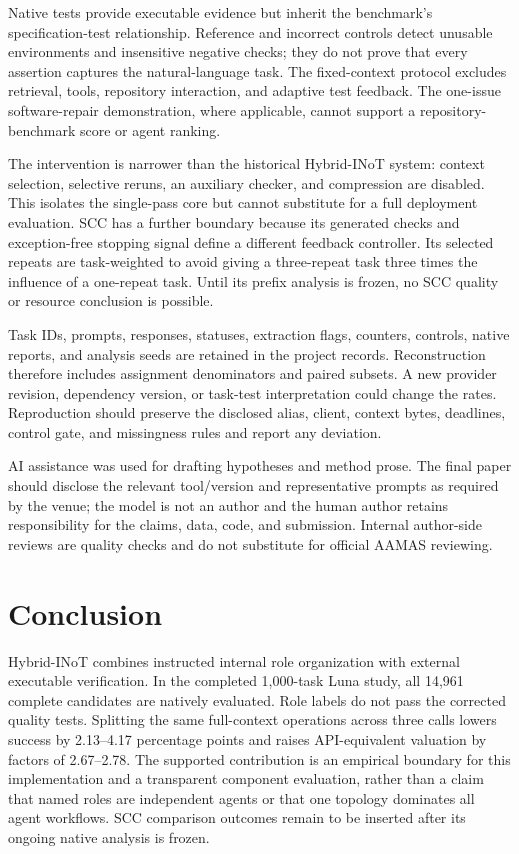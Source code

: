 Native tests provide executable evidence but inherit the benchmark's specification-test relationship. Reference and incorrect controls detect unusable environments and insensitive negative checks; they do not prove that every assertion captures the natural-language task. The fixed-context protocol excludes retrieval, tools, repository interaction, and adaptive test feedback. The one-issue software-repair demonstration, where applicable, cannot support a repository-benchmark score or agent ranking.

The intervention is narrower than the historical Hybrid-INoT system: context selection, selective reruns, an auxiliary checker, and compression are disabled. This isolates the single-pass core but cannot substitute for a full deployment evaluation. SCC has a further boundary because its generated checks and exception-free stopping signal define a different feedback controller. Its selected repeats are task-weighted to avoid giving a three-repeat task three times the influence of a one-repeat task. Until its prefix analysis is frozen, no SCC quality or resource conclusion is possible.

Task IDs, prompts, responses, statuses, extraction flags, counters, controls, native reports, and analysis seeds are retained in the project records. Reconstruction therefore includes assignment denominators and paired subsets. A new provider revision, dependency version, or task-test interpretation could change the rates. Reproduction should preserve the disclosed alias, client, context bytes, deadlines, control gate, and missingness rules and report any deviation.

AI assistance was used for drafting hypotheses and method prose. The final paper should disclose the relevant tool/version and representative prompts as required by the venue; the model is not an author and the human author retains responsibility for the claims, data, code, and submission. Internal author-side reviews are quality checks and do not substitute for official AAMAS reviewing.

\section{Conclusion}
Hybrid-INoT combines instructed internal role organization with external executable verification. In the completed 1,000-task Luna study, all 14,961 complete candidates are natively evaluated. Role labels do not pass the corrected quality tests. Splitting the same full-context operations across three calls lowers success by 2.13--4.17 percentage points and raises API-equivalent valuation by factors of 2.67--2.78. The supported contribution is an empirical boundary for this implementation and a transparent component evaluation, rather than a claim that named roles are independent agents or that one topology dominates all agent workflows. SCC comparison outcomes remain to be inserted after its ongoing native analysis is frozen.
